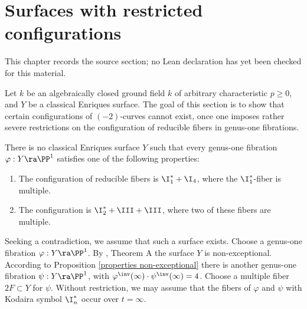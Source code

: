 \chapter{Surfaces  with restricted configurations}
\label{no-enriques-surface-over-the-integers-chapter-15}

\begin{remark}
\label{no-enriques-surface-over-the-integers-chapter-15-source}
This chapter records the source section; no Lean declaration has yet been checked for this material.
\notready
\end{remark}

\label{Restricted configurations}

Let $k$ be an algebraically closed ground field $k$ of arbitrary characteristic $p\geq 0$,
and $Y$ be a classical Enriques surface. The goal of this section is
to show that certain configurations of $(-2)$-curves cannot exist, once one imposes rather severe
restrictions on the configuration of reducible fibers in genus-one fibrations.

\begin{proposition}
\notready
\label{only two configurations}
There is no classical Enriques surface $Y$ such that every genus-one fibration $\varphi:Y\ra\PP^1$
satisfies one of the following properties:
\begin{enumerate}
\item
The configuration of reducible fibers is $\I_1^*+\I_4$, where the $\I_1^*$-fiber is multiple.
\item
The configuration  is $\I_2^*+\III+\III$, where two of these fibers are multiple.
\end{enumerate}
\end{proposition}

\proof
Seeking a contradiction, we assume that such a surface exists. Choose a genus-one fibration $\varphi:Y\ra \PP^1$.
By \cite{Ekedahl-Shepherd-Barron-2004}, Theorem A the surface $Y$ is non-exceptional.
According to Proposition \ref{properties non-exceptional} there is another genus-one fibration $\psi:Y\ra\PP^1$,
with $\varphi^\inv(\infty)\cdot\psi^\inv(\infty)=4$. Choose a multiple fiber  $2F\subset Y$ for   $\psi$.
Without restriction, we may assume that the fibers of $\varphi$ and $\psi$ with Kodaira symbol $\I_n^*$ occur over
$t=\infty$.

